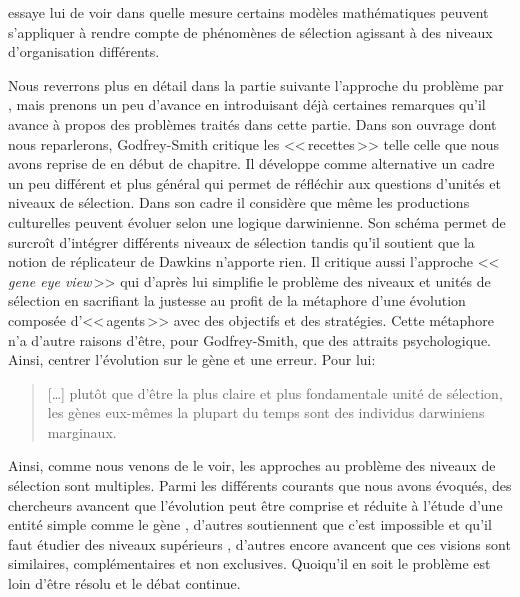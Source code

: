 \cite{okasha2006evolutionandthelevelsofselection} essaye lui de voir dans quelle mesure certains modèles mathématiques peuvent s'appliquer à rendre compte de phénomènes de sélection agissant à des niveaux d'organisation différents.

Nous reverrons plus en détail dans la partie suivante l'approche du problème par \cite{godfrey2009darwinian}, mais prenons un peu d'avance en introduisant déjà certaines remarques qu'il avance à propos des problèmes traités dans cette partie.  Dans son ouvrage dont nous reparlerons, Godfrey-Smith critique les <<\,recettes\,>> telle celle que nous avons reprise de \cite{lewontin70unitsselection} en début de chapitre. Il développe comme alternative un cadre un peu différent et plus général qui permet de réfléchir aux questions d'unités et niveaux de sélection. Dans son cadre il considère que même les productions culturelles \citep[p.~147]{godfrey2009darwinian} peuvent évoluer selon une logique darwinienne. Son schéma permet de surcroît d'intégrer différents niveaux de sélection tandis qu'il soutient que la notion de réplicateur de Dawkins n'apporte rien. Il critique aussi l'approche <<\,\emph{gene eye view}\,>> \citep[pp.~129-145]{godfrey2009darwinian} qui d'après lui simplifie le problème des niveaux et unités de sélection en sacrifiant la justesse au profit de la métaphore d'une évolution composée d'<<\,agents\,>> avec des objectifs et des stratégies. Cette métaphore n'a d'autre raisons d'être, pour Godfrey-Smith, que des attraits psychologique. Ainsi, centrer l'évolution sur le gène et une erreur. Pour lui:
\begin{quotation}
	[\ldots] plutôt que d'être la plus claire et plus fondamentale unité de sélection, les gènes eux-mêmes la plupart du temps sont des individus darwiniens marginaux.
	\citep[p.~145]{godfrey2009darwinian}
\end{quotation}

Ainsi, comme nous venons de le voir, les approches au problème des niveaux de sélection sont multiples. Parmi les différents courants que nous avons évoqués, des chercheurs avancent que l'évolution peut être comprise et réduite à l'étude d'une entité simple comme le gène \citep{dawkins76selfishgene,dennett95darwinsdangerousideaevolutionmeaningslife}, d'autres soutiennent que c'est impossible et qu'il faut étudier des niveaux supérieurs \citep{gould2002thestructureofevolutionarytheory,wilson1989revivingsuperorganism,bouchard2009understandingcolonialtraitsusingsymbiosisresearchandecosystemecology}, d'autres encore avancent que ces visions sont similaires, complémentaires et non exclusives. Quoiqu'il en soit le problème est loin d'être résolu et le débat continue. 

